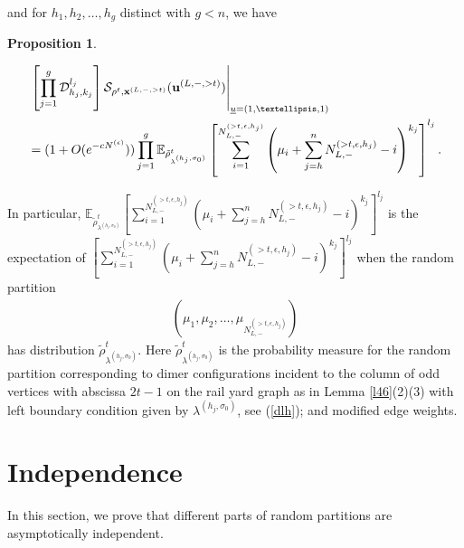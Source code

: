 \documentclass[11pt]{amsart}
\theoremstyle{plain}
\newtheorem{proposition}[theorem]{Proposition}
\theoremstyle{definition}
\theoremstyle{remark}
\numberwithin{equation}{section}
\numberwithin{theorem}{section}
\numberwithin{figure}{section}
\begin{document}
and for $h_1,h_2,\ldots,h_g$ distinct with $g<n$, we have
\begin{proposition}\label{p43}
\begin{small}
\begin{align}
\label{ee3}&\left.
\left[\prod_{j=1}^g\mathcal{D}_{h_j,k_j}^{l_j}\right]\mathcal{S}_{\rho^t,\mathbf{x}^{(L,-,> t)}}(\mathbf{u}^{(L,-,> t)})\right|_{\underline{u}
=(1,\ldots,1)}\\&=(1+O(e^{-cN^{(\epsilon)}}))
\prod_{j=1}^{g}\mathbb{E}_{\tilde{\rho}^t_{\lambda^{(h_j,\sigma_0)}}}\left[\sum_{i=1}^{N_{L,-}^{(>t,\epsilon,h_j)}}\left(\mu_i+\sum_{j=h}^n N_{L,-}^{(>t,\epsilon,h_j)}-i\right)^{k_j}\right]^{l_j}.\notag
\end{align}
\end{small}
\end{proposition}

In particular, $\mathbb{E}_{\tilde{\rho}^t_{\lambda^{(h_j,\sigma_0)}}}\left[\sum_{i=1}^{N_{L,-}^{(>t,\epsilon,h_j)}}\left(\mu_i+\sum_{j=h}^n N_{L,-}^{(>t,\epsilon,h_j)}-i\right)^{k_j}\right]^{l_j}$ is the expectation of  $\left[\sum_{i=1}^{N_{L,-}^{(>t,\epsilon,h_j)}}\left(\mu_i+\sum_{j=h}^n N_{L,-}^{(>t,\epsilon,h_j)}-i\right)^{k_j}\right]^{l_j}$ when the random partition
\begin{align*}
\left(\mu_1,\mu_2,\ldots, \mu_{N_{L,-}^{(>t,\epsilon,h_j)}}\right)
\end{align*}
has distribution $\tilde{\rho}^t_{\lambda^{(h_j,\sigma_0)}}$. Here $\tilde{\rho}^t_{\lambda^{(h_j,\sigma_0)}}$ is the probability measure for the random partition corresponding to dimer configurations incident to the column of odd vertices with abscissa $2t-1$ on the rail yard graph as in Lemma \ref{l46}(2)(3) with left boundary condition given by $\lambda^{(h_j,\sigma_0)}$, see (\ref{dlh}); and modified edge weights.

\section{Independence}\label{sect:idp}

In this section, we prove that different parts of random partitions are asymptotically independent.
\end{document}
